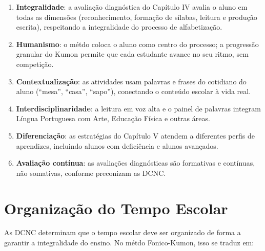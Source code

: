 \begin{enumerate}[leftmargin=2cm]
  \item \textbf{Integralidade}: a avalia\c{c}\~{a}o diagn\'{o}stica
  do Cap\'{i}tulo IV avalia o aluno em todas as dimens\~{o}es
  (reconhecimento, forma\c{c}\~{a}o de s\'{i}labas, leitura e
  produ\c{c}\~{a}o escrita), respeitando a integralidade do
  processo de alfabetiza\c{c}\~{a}o.

  \item \textbf{Humanismo}: o m\'{e}tdo coloca o aluno como centro
  do processo; a progress\~{a}o granular do Kumon permite que cada
  estudante avance no seu ritmo, sem competi\c{c}\~{a}o.

  \item \textbf{Contextualiza\c{c}\~{a}o}: as atividades usam
  palavras e frases do cotidiano do aluno (``mesa'', ``casa'',
  ``sapo''), conectando o conte\'{u}do escolar à vida real.

  \item \textbf{Interdisciplinaridade}: a leitura em voz alta
  e o painel de palavras integram L\'{i}ngua Portuguesa com
  Arte, Educa\c{c}\~{a}o F\'{i}sica e outras \'{a}reas.

  \item \textbf{Diferencia\c{c}\~{a}o}: as estrat\'{e}gias do
  Cap\'{i}tulo V atendem a diferentes perfis de aprendizes,
  incluindo alunos com defici\^{e}ncia e alunos avan\c{c}ados.

  \item \textbf{Avalia\c{c}\~{a}o cont\'{i}nua}: as avalia\c{c}\~{o}es
  diagn\'{o}sticas s\~{a}o formativas e cont\'{i}nuas, n\~{a}o
  somativas, conforme preconizam as DCNC.
\end{enumerate}

\section{Organiza\c{c}\~{a}o do Tempo Escolar}

As DCNC determinam que o tempo escolar deve ser organizado de forma
a garantir a integralidade do ensino. No m\'{e}tdo Fonico-Kumon,
isso se traduz em:

